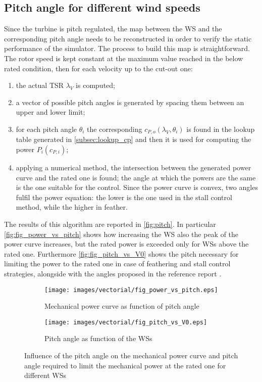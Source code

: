 \subsection{Pitch angle for different wind speeds}\label{subsec:pitch_map}
Since the turbine is pitch regulated, the map between the \acrshort{WS} and the corresponding pitch angle needs to be reconstructed in order to verify the static performance of the simulator. The process to build this map is straightforward. The rotor speed is kept constant at the maximum value reached in the below rated condition, then for each velocity up to the cut-out one:
\begin{enumerate}
    \item  the actual \acrshort{TSR} $\lambda_V$ is computed;
    \item a vector of possible pitch angles is generated by spacing them between an upper and lower limit;
    \item for each pitch angle $\theta_i$ the corresponding $c_{P,o}(\lambda_V, \theta_i)$ is found in the lookup table generated in \autoref{subsec:lookup_cp} and then it is used for computing the power $P_i(c_{P,i})$;
    \item applying a numerical method, the intersection between the generated power curve and the rated one is found; the angle at which the powers are the same is the one suitable for the control. Since the power curve is convex, two angles fulfil the power equation: the lower is the one used in the stall control method, while the higher in feather.
\end{enumerate}
The results of this algorithm are reported in \autoref{fig:pitch}. In particular \autoref{fig:fig_power_vs_pitch} shows how increasing the \acrshort{WS} also the peak of the power curve increases, but the rated power is exceeded only for \acrshort{WSs} above the rated one. Furthermore \autoref{fig:fig_pitch_vs_V0} shows the pitch necessary for limiting the power to the rated one in case of feathering and stall control strategies, alongside with the angles proposed in the reference report \cite{DTU_Wind_Energy_Report-I-0092}. 
\begin{figure}[htb]
    \centering
    \begin{subfigure}{0.49\textwidth}
    \centering
    \texttt{[image: images/vectorial/fig\_power\_vs\_pitch.eps]}
    \caption{Mechanical power curve as function of pitch angle}
    \label{fig:fig_power_vs_pitch}
    \end{subfigure}
    \begin{subfigure}{0.49\textwidth}
    \texttt{[image: images/vectorial/fig\_pitch\_vs\_V0.eps]}
    \caption{Pitch angle as function of the \acrshort{WSs}}
    \label{fig:fig_pitch_vs_V0}
    \end{subfigure}
    \caption{Influence of the pitch angle on the mechanical power curve and pitch angle required to limit the mechanical power at the rated one for different \acrshort{WSs}}
    \label{fig:pitch}
\end{figure}

